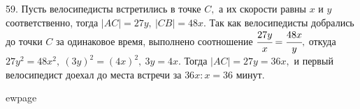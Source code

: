 59. Пусть велосипедисты встретились в точке $C,$ а их скорости равны $x$ и $y$ соответственно, тогда $|AC|=27y,\ |CB|=48x.$ Так как велосипедисты добрались до точки $C$ за одинаковое время, выполнено соотношение $\cfrac{27y}{x}=\cfrac{48x}{y},$ откуда $27y^2=48x^2,\ (3y)^2=(4x)^2,\ 3y=4x.$ Тогда $|AC|=27y=36x,$ и первый велосипедист доехал до места встречи за $36x:x=36$ минут.

ewpage
